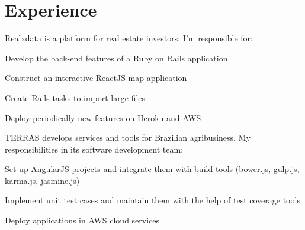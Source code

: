 \documentclass[]{joaosoares-resume}
\begin{document}
\begin{minipage}[t]{0.60\textwidth}

\section{Experience}
{\justifying Realxdata is a platform for real estate investors. I'm responsible for:\par}
\sectionsep
\begin{tightemize}
\item Develop the back-end features of a Ruby on Rails application
\item Construct an interactive ReactJS map application
\item Create Rails tasks to import large files
\item Deploy periodically new features on Heroku and AWS
\end{tightemize}

\sectionsep

{\justifying TERRAS develops services and tools for Brazilian agribusiness. My responsibilities in its software development team:\par}
\begin{tightemize}
\item Set up AngularJS projects and integrate them with build tools (bower.js, gulp.js, karma.js, jasmine.js)
\item Implement unit test cases and maintain them with the help of test coverage tools
\item Deploy applications in AWS cloud services
\end{tightemize}

\sectionsep


\end{minipage}
\end{document}
